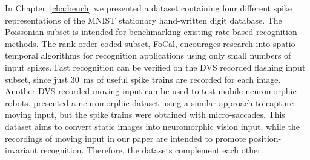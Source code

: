 %
In Chapter~\ref{cha:bench} we presented a dataset containing four different spike representations of the MNIST stationary hand-written digit database. %
The Poissonian subset is intended for benchmarking existing rate-based recognition methods.
The rank-order coded subset, FoCal, encourages research into spatio-temporal algorithms for recognition applications using only small numbers of input spikes.
Fast recognition can be verified on the DVS recorded flashing input subset, since just 30~ms of useful spike trains are recorded for each image.
Another DVS recorded moving input can be used to test mobile neuromorphic robots.
\citet{orchard2015convert} presented a neuromorphic dataset using a similar approach to capture moving input, but the spike trains were obtained with micro-saccades.
This dataset aims to convert static images into neuromorphic vision input, while the recordings of moving input in our paper are intended to promote position-invariant recognition.
Therefore, the datasets complement each other.

